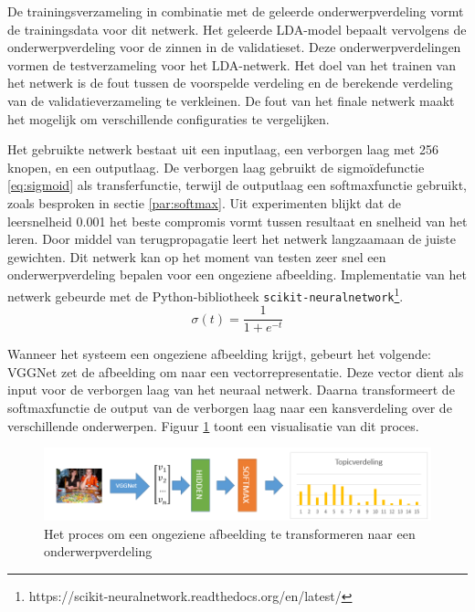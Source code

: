 De trainingsverzameling in combinatie met de geleerde onderwerpverdeling vormt de trainingsdata voor dit netwerk. 
Het geleerde LDA-model bepaalt vervolgens de onderwerpverdeling voor de zinnen in de validatieset. Deze onderwerpverdelingen vormen de testverzameling voor het LDA-netwerk. Het doel van het trainen van het netwerk is de fout tussen de voorspelde verdeling en de berekende verdeling van de validatieverzameling te verkleinen. De fout van het finale netwerk maakt het mogelijk om verschillende configuraties te vergelijken.

Het gebruikte netwerk bestaat uit een inputlaag, een verborgen laag met 256 knopen, en een outputlaag. De verborgen laag gebruikt de sigmo\"idefunctie \eqref{eq:sigmoid} als transferfunctie, terwijl de outputlaag een softmaxfunctie gebruikt, zoals besproken in sectie \ref{par:softmax}. Uit experimenten blijkt dat de leersnelheid 0.001 het beste compromis vormt tussen resultaat en snelheid van het leren.
Door middel van terugpropagatie leert het netwerk langzaamaan de juiste gewichten. Dit netwerk kan op het moment van testen zeer snel een onderwerpverdeling bepalen voor een ongeziene afbeelding. Implementatie van het netwerk gebeurde met de Python-bibliotheek \texttt{scikit-neuralnetwork}\footnote{https://scikit-neuralnetwork.readthedocs.org/en/latest/}.
\begin{equation}
\sigma(t) = \frac{1}{1 + e^{-t}}
\label{eq:sigmoid}
\end{equation}

Wanneer het systeem een ongeziene afbeelding krijgt, gebeurt het volgende: VGGNet zet de afbeelding om naar een vectorrepresentatie. Deze vector dient als input voor de verborgen laag van het neuraal netwerk. Daarna transformeert de softmaxfunctie de output van de verborgen laag naar een kansverdeling over de verschillende onderwerpen. Figuur \ref{fig:learningLDA} toont een visualisatie van dit proces.


\begin{figure}[tb]
    \centering
    \includegraphics[width=\linewidth]{Images/LDANetwerk.PNG}
    \caption{Het proces om een ongeziene afbeelding te transformeren naar een onderwerpverdeling}
    \label{fig:learningLDA}
\end{figure}

